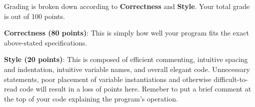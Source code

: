 \documentclass{article}
\begin{document}
Grading is broken down according to \textbf{Correctness} and \textbf{Style}. Your total grade is out of 100 points.

\noindent\textbf{Correctness (80 points)}: This is simply how well your program fits the exact above-stated specifications.

\noindent\textbf{Style (20 points)}: This is composed of efficient commenting, intuitive spacing and indentation, intuitive variable names, and overall elegant code. Unnecessary statements, poor placement of variable instantiations and otherwise difficult-to-read code will result in a loss of points here. Remeber to put a brief comment at the top of your code explaining the program's operation.
\end{document}
